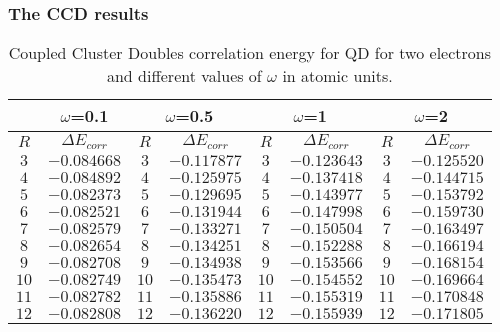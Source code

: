 \documentclass[twoside,english]{uiofysmaster}
\theoremstyle{definition}
\begin{document}
\subsubsection{The CCD results}
\begin{table}[h!]
	\begin{center}
		\begin{tabular}{|c c| c c| c c| c c|}
			\hline
			\multirow{2}{*}{} & 
			\multicolumn{1}{c}{$\omega$=0.1} \vline& 
			\multicolumn{2}{c}{$\omega$=0.5} \vline&
			\multicolumn{2}{c}{$\omega$=1} \vline&
			\multicolumn{2}{c}{$\omega$=2} \vline\\
			\hline
			$R$  & $\Delta E_{corr}$ & $R$ & $\Delta E_{corr}$ & $R$  & $\Delta E_{corr}$ &$R$ &  $\Delta E_{corr}$  \\
			\hline
			$  3 $   & $-0.084668$  &$ 3 $  & $-0.117877$  &$  3 $   & $-0.123643$   &$ 3$  & $-0.125520$   \\
			$  4 $   & $-0.084892$  &$ 4 $  & $-0.125975$  &$  4 $   & $-0.137418$   &$ 4$  & $-0.144715$   \\
			$  5 $   & $-0.082373$  &$ 5 $  & $-0.129695$  &$  5 $   & $-0.143977$   &$ 5$  & $-0.153792$   \\
			$  6 $   & $-0.082521$  &$ 6 $  & $-0.131944$  &$  6 $   & $-0.147998$   &$ 6$  & $-0.159730$   \\
			$  7 $   & $-0.082579$  &$ 7 $  & $-0.133271$  &$  7 $   & $-0.150504$   &$ 7$  & $-0.163497$   \\
			$  8 $   & $-0.082654$  &$ 8 $  & $-0.134251$  &$  8 $   & $-0.152288$   &$ 8$  & $-0.166194$   \\
			$  9 $   & $-0.082708$  &$ 9 $  & $-0.134938$  &$  9 $   & $-0.153566$   &$ 9$  & $-0.168154$   \\
			$  10$   & $-0.082749$  &$ 10$  & $-0.135473$  &$  10$   & $-0.154552$   &$ 10$ & $-0.169664$   \\
			$  11$   & $-0.082782$  &$ 11$  & $-0.135886$  &$  11$   & $-0.155319$   &$ 11$ & $-0.170848$   \\
			$  12$   & $-0.082808$  &$ 12$  & $-0.136220$  &$  12$   & $-0.155939$   &$ 12$ & $-0.171805$   \\
			\hline                                                                                    
		\end{tabular}
		\caption{Coupled Cluster Doubles correlation energy for QD for two electrons and different values of $\omega$ in atomic units. }   \label{tab:resultsCCD}
	\end{center}
\end{table}
\end{document}
